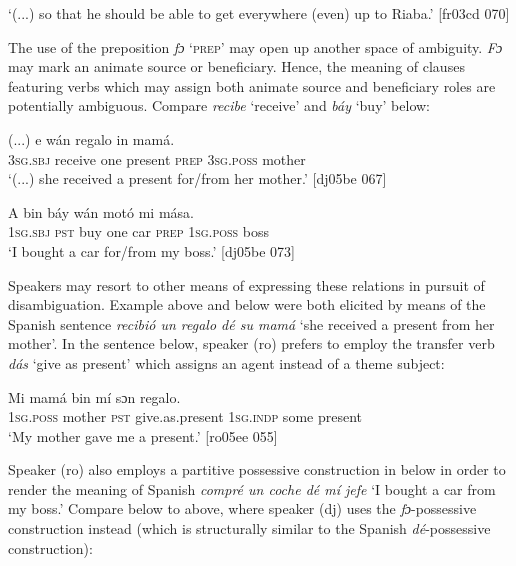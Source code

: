 \glt ‘(...) so that he should be able to get everywhere (even) up to Riaba.’ [fr03cd 070]
\z

The use of the preposition \textit{fɔ} ‘\textsc{prep}’ may open up another space of ambiguity. \textit{F}\textit{ɔ} may mark an animate source or beneficiary. Hence, the meaning of clauses featuring verbs which may assign both animate source and beneficiary roles are potentially ambiguous. Compare \textit{recibe} ‘receive’ and \textit{báy} ‘buy’ below: 


\ea%
    \label{ex:key:982}
    \gll (...)  e      wán  regalo   in    mamá.\\
{}  \textsc{3sg.sbj}  receive  one  present  \textsc{prep}  \textsc{3sg.poss}  mother\\

\glt ‘(...) she received a present for/from her mother.’ [dj05be 067]
\z


\ea%
    \label{ex:key:983}
    \gll A    bin  báy  wán  motó   mi    mása.\\
\textsc{1sg.sbj}  \textsc{pst}  buy  one  car    \textsc{prep}  \textsc{1sg.poss}  boss\\

\glt ‘I bought a car for/from my boss.’ [dj05be 073]
\z

Speakers may resort to other means of expressing these relations in pursuit of disambiguation. Example  above and  below were both elicited by means of the Spanish sentence \textit{recibió un regalo dé su mamá} ‘she received a present from her mother’. In the sentence below, speaker (ro) prefers to employ the transfer verb \textit{dás} ‘give as present’ which assigns an agent instead of a theme subject: 


\ea%
    \label{ex:key:984}
    \gll Mi    mamá  bin          mí    sɔn    regalo.\\
\textsc{1sg.poss}  mother  \textsc{pst}  give.as.present  \textsc{1sg.indp}  some  present\\

\glt ‘My mother gave me a present.’ [ro05ee 055]
\z

Speaker (ro) also employs a partitive possessive construction in  below in order to render the meaning of Spanish \textit{compré un coche dé mí jefe} ‘I bought a car from my boss.’ Compare  below to  above, where speaker (dj) uses the \textit{fɔ}{}-possessive construction instead (which is structurally similar to the Spanish \textit{dé}{}-possessive construction):


